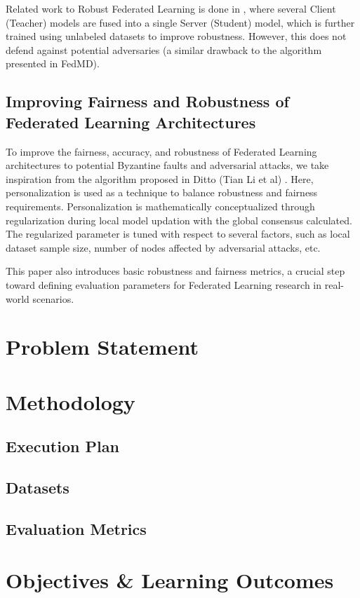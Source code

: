 \documentclass[conference]{IEEEtran}
\begin{document}
Related work to Robust Federated Learning is done in \cite{b5}, where several Client (Teacher) models are fused into a single Server (Student) model, which is further trained using unlabeled datasets to improve robustness. However, this does not defend against potential adversaries (a similar drawback to the algorithm presented in FedMD).
\subsection{Improving Fairness and Robustness of Federated Learning Architectures}
To improve the fairness, accuracy, and robustness of Federated Learning architectures to potential Byzantine faults and adversarial attacks, we take inspiration from the algorithm proposed in Ditto (Tian Li et al) \cite{b6}. Here, personalization is used as a technique to balance robustness and fairness requirements. Personalization is mathematically conceptualized through regularization during local model updation with the global consensus calculated. The regularized parameter is tuned with respect to several factors, such as local dataset sample size, number of nodes affected by adversarial attacks, etc.

This paper also introduces basic robustness and fairness metrics, a crucial step toward defining evaluation parameters for Federated Learning research in real-world scenarios.
\section{Problem Statement}

\section{Methodology}
\subsection{Execution Plan}
\subsection{Datasets}
\subsection{Evaluation Metrics}

\section{Objectives \& Learning Outcomes}
\end{document}
